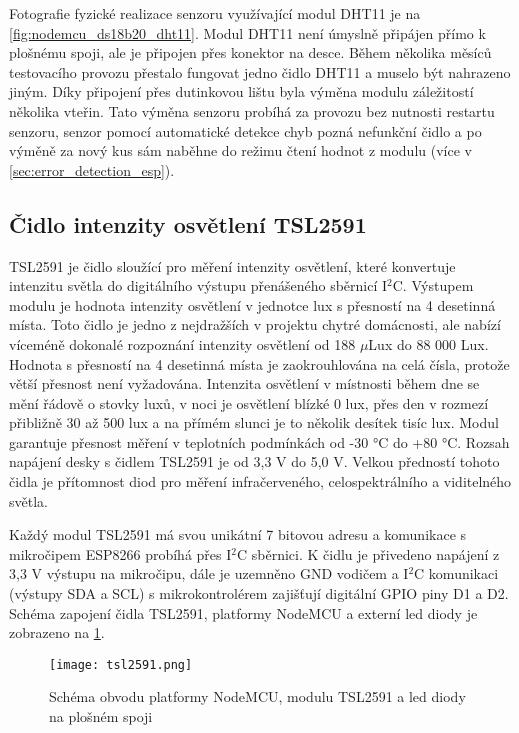 Fotografie fyzické realizace senzoru využívající modul DHT11 je na \cref{fig:nodemcu_ds18b20_dht11}. Modul DHT11 není úmyslně připájen přímo k plošnému spoji, ale je připojen přes konektor na desce. Během několika měsíců testovacího provozu přestalo fungovat jedno čidlo DHT11 a muselo být nahrazeno jiným. Díky připojení přes dutinkovou lištu byla výměna modulu záležitostí několika vteřin. Tato výměna senzoru probíhá za provozu bez nutnosti restartu senzoru, senzor pomocí automatické detekce chyb pozná nefunkční čidlo a po výměně za nový kus sám naběhne do režimu čtení hodnot z modulu (více v \cref{sec:error_detection_esp}).

\subsection{Čidlo intenzity osvětlení TSL2591}

TSL2591 \cite{TSL2591:Datasheet} je čidlo sloužící pro měření intenzity osvětlení, které konvertuje intenzitu světla do digitálního výstupu přenášeného sběrnicí I$^2$C. Výstupem modulu je hodnota intenzity osvětlení v jednotce \si{lux} s přesností na 4 desetinná místa. Toto čidlo je jedno z nejdražších v projektu chytré domácnosti, ale nabízí víceméně dokonalé rozpoznání intenzity osvětlení od 188 $\mu$Lux do 88 000 Lux. Hodnota s přesností na 4 desetinná místa je zaokrouhlována na celá čísla, protože větší přesnost není vyžadována. Intenzita osvětlení v místnosti během dne se mění řádově o stovky luxů, v noci je osvětlení blízké 0 \si{lux}, přes den v rozmezí přibližně 30 až 500 \si{lux} a na přímém slunci je to několik desítek tisíc \si{lux}. Modul garantuje přesnost měření v teplotních podmínkách od -30 \si{\degree}C do +80 \si{\degree}C. Rozsah napájení desky s čidlem TSL2591 je od 3,3 V do 5,0 V. Velkou předností tohoto čidla je přítomnost diod pro měření infračerveného, celospektrálního a viditelného světla. \par
Každý modul TSL2591 má svou unikátní 7 bitovou adresu a komunikace s mikročipem ESP8266 probíhá přes I$^2$C sběrnici. K čidlu je přivedeno napájení z 3,3 V výstupu na mikročipu, dále je uzemněno GND vodičem a I$^2$C komunikaci (výstupy SDA a SCL) s mikrokontrolérem zajišťují digitální GPIO piny D1 a D2. Schéma zapojení čidla TSL2591, platformy NodeMCU a externí led diody je zobrazeno na \cref{fig:schema_esp_tsl2591}.

\begin{figure}[H]
  \centering
  \texttt{[image: tsl2591.png]}
  \caption{Schéma obvodu platformy NodeMCU, modulu TSL2591 a led diody na plošném spoji}
  \label{fig:schema_esp_tsl2591}
\end{figure}

